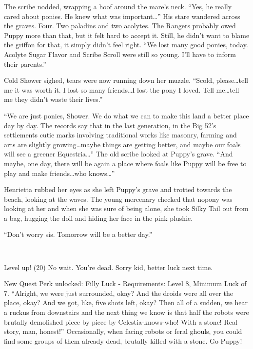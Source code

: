 The scribe nodded, wrapping a hoof around the mare's neck. ``Yes, he really cared about ponies. He knew what was important\dots'' His stare wandered across the graves. Four. Two paladins and two acolytes. The Rangers probably owed Puppy more than that, but it felt hard to accept it. Still, he didn't want to blame the griffon for that, it simply didn't feel right. ``We lost many good ponies, today. Acolyte Sugar Flavor and Scribe Scroll were still so young. I'll have to inform their parents.''

Cold Shower sighed, tears were now running down her muzzle. ``Scold, please\dots tell me it was worth it. I lost so many friends\dots I lost the pony I loved. Tell me\dots tell me they didn't waste their lives.''

``We are just ponies, Shower. We do what we can to make this land a better place day by day. The records say that in the last generation, in the Big 52's settlements cutie marks involving traditional works like masonry, farming and arts are slightly growing\dots maybe things are getting better, and maybe our foals will see a greener Equestria\dots'' The old scribe looked at Puppy's grave. ``And maybe, one day, there will be again a place where foals like Puppy will be free to play and make friends\dots who knows\dots''

Henrietta rubbed her eyes as she left Puppy's grave and trotted towards the beach, looking at the waves. The young mercenary checked that nopony was looking at her and when she was sure of being alone, she took Silky Tail out from a bag, hugging the doll and hiding her face in the pink plushie.

``Don't worry sis. Tomorrow will be a better day.''

~\vfill

\begin{engnote}
    Level up! (20) No wait. You're dead. Sorry kid, better luck next time.
    
    New Quest Perk unlocked: Filly Luck - Requirements: Level 8, Minimum Luck of 7. ``Alright, we were just surrounded, okay? And the droids were all over the place, okay? And we got, like, five shots left, okay? Then all of a sudden, we hear a ruckus from downstairs and the next thing we know is that half the robots were brutally demolished piece by piece by Celestia-knows-who! With a stone! Real story, man, honest!'' Occasionally, when facing robots or feral ghouls, you could find some groups of them already dead, brutally killed with a stone. Go Puppy!
\end{engnote}

